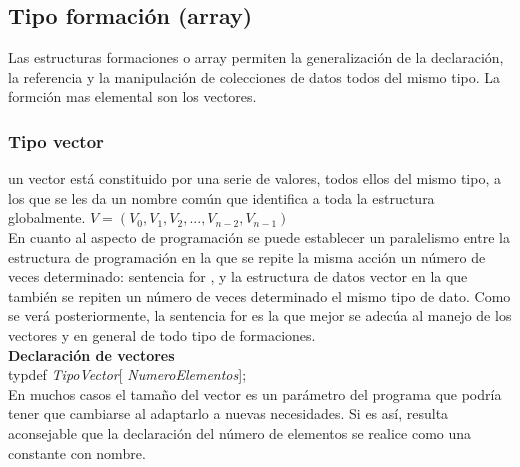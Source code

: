 \documentclass[11pt,a4paper]{article}
\begin{document}
  \subsection{Tipo formación (array)}
  Las estructuras formaciones o array permiten la generalización de la declaración, la referencia y la manipulación de colecciones de datos todos del mismo tipo. La formción mas elemental son los vectores.
  \subsubsection{Tipo vector}
  un vector está constituido por una serie de valores, todos ellos del mismo tipo, a los que se les da un nombre común que
  identifica a toda la estructura globalmente.
  $V = (V_{0}, V_{1}, V_{2},...,V_{n-2}, V_{n-1})$
  \\
  En cuanto al aspecto de programación se puede establecer un paralelismo entre
  la estructura de programación en la que se repite la misma acción un número
  de veces determinado: sentencia for , y la estructura de datos vector en la que
  también se repiten un número de veces determinado el mismo tipo de dato.
  Como se verá posteriormente, la sentencia for es la que mejor se adecúa al manejo de los vectores y en general de todo tipo de formaciones.
  \\
  \textbf{Declaración de vectores} 
  \\
  typdef \textit{TipoVector}[ \textit{NumeroElementos}];\\
  En muchos casos el tamaño del vector es un parámetro del programa que
  podría tener que cambiarse al adaptarlo a nuevas necesidades. Si es así, resulta aconsejable que la declaración del número de elementos se realice como una constante con nombre.
  
\end{document}

